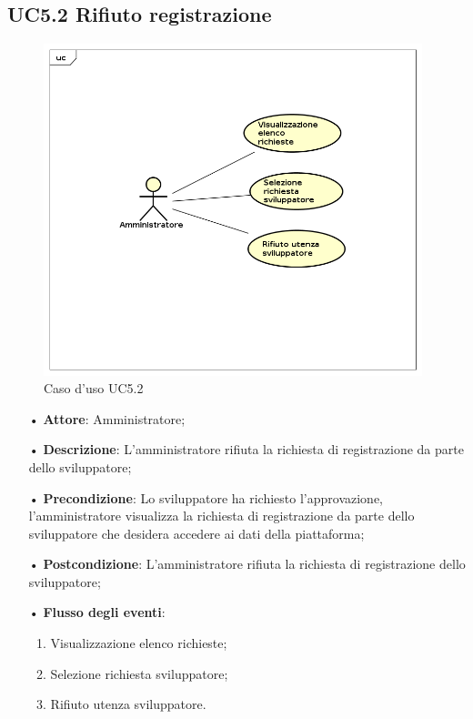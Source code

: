 \subsection{UC5.2 Rifiuto registrazione}

\begin{figure}[H]
\centering
\includegraphics[width=11cm]{img/UC52.png} 
\caption{Caso d'uso UC5.2}
\end{figure}


\begin{itemize}
\item[•] \textbf{Attore}: Amministratore;

\item[•] \textbf{Descrizione}: L’amministratore rifiuta la richiesta di registrazione da parte dello sviluppatore;

\item[•] \textbf{Precondizione}: Lo sviluppatore ha richiesto l’approvazione, l’amministratore visualizza la richiesta di registrazione da parte dello sviluppatore che desidera accedere ai dati della piattaforma;

\item[•] \textbf{Postcondizione}: L’amministratore rifiuta la richiesta di registrazione dello sviluppatore;

\item[•] \textbf{Flusso degli eventi}:

\begin{enumerate}

\item Visualizzazione elenco richieste;

\item Selezione richiesta sviluppatore;

\item Rifiuto utenza sviluppatore.

\end{enumerate}
\end{itemize}
